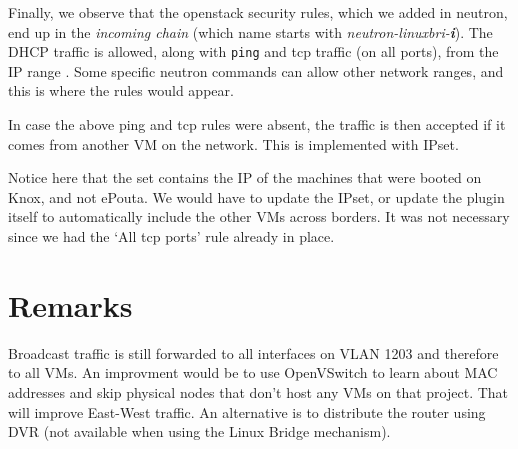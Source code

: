 
Finally, we observe that the openstack security rules, which we added
in neutron, end up in the \emph{incoming chain} (which name starts
with \emph{neutron-linuxbri-\textbf{i}}). The DHCP traffic is allowed,
along with \texttt{ping} and tcp traffic (on all ports), from the IP
range . Some specific neutron commands can allow
other network ranges, and this is where the rules would appear.


In case the above ping and tcp rules were absent, the traffic is then
accepted if it comes from another VM on the network. This is
implemented with IPset.


Notice here that the set contains the IP of the machines that were
booted on Knox, and not ePouta. We would have to update the IPset, or
update the plugin itself to automatically include the other VMs across
borders. It was not necessary since we had the `All tcp ports' rule
already in place.

\section{Remarks}\label{remarks}

Broadcast traffic is still forwarded to all interfaces on VLAN 1203
and therefore to all VMs. An improvment would be to use OpenVSwitch to
learn about MAC addresses and skip physical nodes that don't host any
VMs on that project. That will improve East-West traffic. An
alternative is to distribute the router using DVR (not available when
using the Linux Bridge mechanism).
